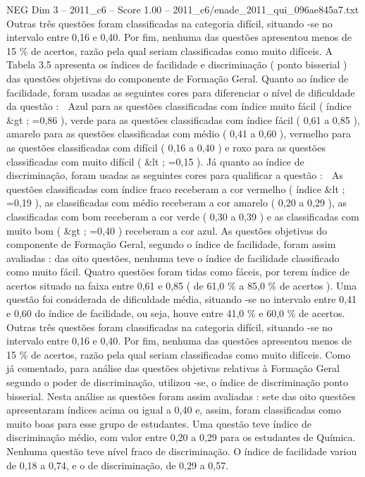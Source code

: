 \begin{textsample}{NEG Dim 3 – 2011\_c6 – Score 1.00 – 2011\_c6/enade\_2011\_qui\_096ae845a7.txt}
Outras três questões foram classificadas na categoria difícil, situando -se no intervalo entre 0,16 e 0,40.
Por fim, nenhuma das questões apresentou menos de 15 \% de acertos, razão pela qual seriam classificadas como muito difíceis.
A Tabela 3.5 apresenta os índices de facilidade e discriminação ( ponto bisserial ) das questões objetivas do componente de Formação Geral.
Quanto ao índice de facilidade, foram usadas as seguintes cores para diferenciar o nível de dificuldade da questão :  Azul para as questões classificadas com índice muito fácil ( índice \&gt ; =0,86 ), verde para as questões classificadas com índice fácil ( 0,61 a 0,85 ), amarelo para as questões classificadas com médio ( 0,41 a 0,60 ), vermelho para as questões classificadas com difícil ( 0,16 a 0,40 ) e roxo para as questões classificadas com muito difícil ( \&lt ; =0,15 ).
Já quanto ao índice de discriminação, foram usadas as seguintes cores para qualificar a questão :  As questões classificadas com índice fraco receberam a cor vermelho ( índice \&lt ; =0,19 ), as classificadas com médio receberam a cor amarelo ( 0,20 a 0,29 ), as classificadas com bom receberam a cor verde ( 0,30 a 0,39 ) e as classificadas com muito bom ( \&gt ; =0,40 ) receberam a cor azul.
As questões objetivas do componente de Formação Geral, segundo o índice de facilidade, foram assim avaliadas : das oito questões, nenhuma teve o índice de facilidade classificado como muito fácil.
Quatro questões foram tidas como fáceis, por terem índice de acertos situado na faixa entre 0,61 e 0,85 ( de 61,0 \% a 85,0 \% de acertos ).
Uma questão foi considerada de dificuldade média, situando -se no intervalo entre 0,41 e 0,60 do índice de facilidade, ou seja, houve entre 41,0 \% e 60,0 \% de acertos.
Outras três questões foram classificadas na categoria difícil, situando -se no intervalo entre 0,16 e 0,40.
Por fim, nenhuma das questões apresentou menos de 15 \% de acertos, razão pela qual seriam classificadas como muito difíceis.
Como já comentado, para análise das questões objetivas relativas à Formação Geral segundo o poder de discriminação, utilizou -se, o índice de discriminação ponto bisserial.
Nesta análise as questões foram assim avaliadas : sete das oito questões apresentaram índices acima ou igual a 0,40 e, assim, foram classificadas como muito boas para esse grupo de estudantes.
Uma questão teve índice de discriminação médio, com valor entre 0,20 a 0,29 para os estudantes de Química.
Nenhuma questão teve nível fraco de discriminação.
O índice de facilidade variou de 0,18 a 0,74, e o de discriminação, de 0,29 a 0,57.

\end{textsample}
